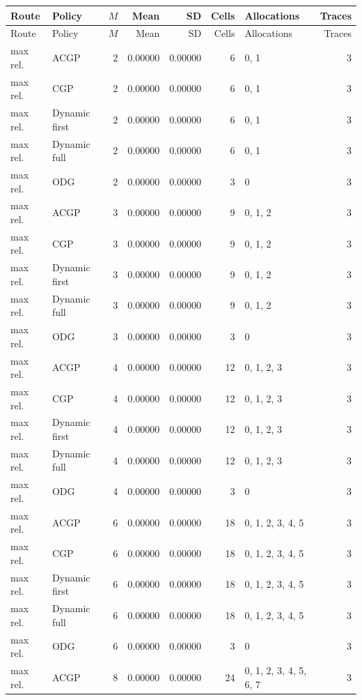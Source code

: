 \documentclass[10pt,a4paper]{article}
\begin{document}
\tiny\setlength{\tabcolsep}{2pt}\begin{longtable}{@{}p{23mm}p{29mm}rrrrp{36mm}r@{}}
\toprule Route & Policy & $M$ & Mean & SD & Cells & Allocations & Traces \\ \midrule\endfirsthead
\toprule Route & Policy & $M$ & Mean & SD & Cells & Allocations & Traces \\ \midrule\endhead
\bottomrule\endfoot
max rel. & ACGP & 2 & 0.00000 & 0.00000 & 6 & 0, 1 & 3 \\
max rel. & CGP & 2 & 0.00000 & 0.00000 & 6 & 0, 1 & 3 \\
max rel. & Dynamic first & 2 & 0.00000 & 0.00000 & 6 & 0, 1 & 3 \\
max rel. & Dynamic full & 2 & 0.00000 & 0.00000 & 6 & 0, 1 & 3 \\
max rel. & ODG & 2 & 0.00000 & 0.00000 & 3 & 0 & 3 \\
max rel. & ACGP & 3 & 0.00000 & 0.00000 & 9 & 0, 1, 2 & 3 \\
max rel. & CGP & 3 & 0.00000 & 0.00000 & 9 & 0, 1, 2 & 3 \\
max rel. & Dynamic first & 3 & 0.00000 & 0.00000 & 9 & 0, 1, 2 & 3 \\
max rel. & Dynamic full & 3 & 0.00000 & 0.00000 & 9 & 0, 1, 2 & 3 \\
max rel. & ODG & 3 & 0.00000 & 0.00000 & 3 & 0 & 3 \\
max rel. & ACGP & 4 & 0.00000 & 0.00000 & 12 & 0, 1, 2, 3 & 3 \\
max rel. & CGP & 4 & 0.00000 & 0.00000 & 12 & 0, 1, 2, 3 & 3 \\
max rel. & Dynamic first & 4 & 0.00000 & 0.00000 & 12 & 0, 1, 2, 3 & 3 \\
max rel. & Dynamic full & 4 & 0.00000 & 0.00000 & 12 & 0, 1, 2, 3 & 3 \\
max rel. & ODG & 4 & 0.00000 & 0.00000 & 3 & 0 & 3 \\
max rel. & ACGP & 6 & 0.00000 & 0.00000 & 18 & 0, 1, 2, 3, 4, 5 & 3 \\
max rel. & CGP & 6 & 0.00000 & 0.00000 & 18 & 0, 1, 2, 3, 4, 5 & 3 \\
max rel. & Dynamic first & 6 & 0.00000 & 0.00000 & 18 & 0, 1, 2, 3, 4, 5 & 3 \\
max rel. & Dynamic full & 6 & 0.00000 & 0.00000 & 18 & 0, 1, 2, 3, 4, 5 & 3 \\
max rel. & ODG & 6 & 0.00000 & 0.00000 & 3 & 0 & 3 \\
max rel. & ACGP & 8 & 0.00000 & 0.00000 & 24 & 0, 1, 2, 3, 4, 5, 6, 7 & 3 \\

\end{longtable}
\end{document}
